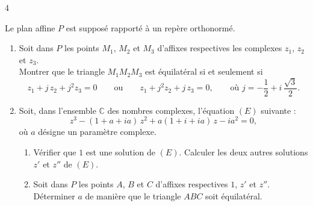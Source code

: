 \documentclass{axiobac}
\begin{document}
\begin{exercice}{4}

Le plan affine $P$ est supposé rapporté à un repère orthonormé.

\begin{enumerate}
    \item Soit dans $P$ les points $M_1$, $M_2$ et $M_3$ d'affixes respectives les complexes $z_1$, $z_2$ et $z_3$. \\
    Montrer que le triangle $M_1 M_2 M_3$ est équilatéral si et seulement si
    \[
    z_1 + j\,z_2 + j^2 z_3 = 0 \qquad \text{ou} \qquad z_1 + j^2 z_2 + j\,z_3 = 0, \qquad \text{où } j = -\frac{1}{2} + i\,\frac{\sqrt{3}}{2} .
    \]
    \item Soit, dans l'ensemble $\mathbb{C}$ des nombres complexes, l'équation $(E)$ suivante :
    \[
    z^3 - (1 + a + ia)\,z^2 + a(1 + i + ia)\,z - i a^2 = 0,
    \]
    où $a$ désigne un paramètre complexe.
    \begin{enumerate}
        \item Vérifier que $1$ est une solution de $(E)$. Calculer les deux autres solutions $z'$ et $z''$ de $(E)$.
        \item Soit dans $P$ les points $A$, $B$ et $C$ d'affixes respectives $1$, $z'$ et $z''$. Déterminer $a$ de manière que le triangle $ABC$ soit équilatéral.
    \end{enumerate}
\end{enumerate}

\end{exercice}
\end{document}
